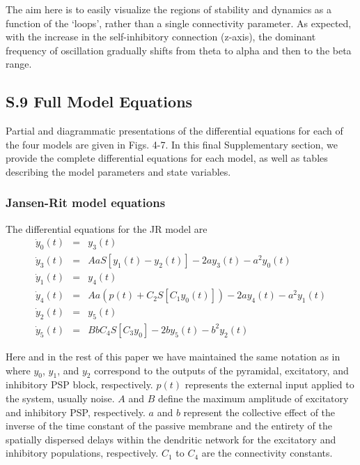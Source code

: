 \documentclass[12pt,twoside]{article}
\begin{document}
The aim here is to easily visualize the regions of stability and dynamics as a function of the `loops', rather than a single connectivity parameter. As expected, with the increase in the self-inhibitory connection (z-axis), the dominant frequency of oscillation gradually shifts from theta to alpha and then to the beta range.




\newpage
\subsection*{S.9 Full Model Equations}

Partial and diagrammatic presentations of the differential equations for each of the four models are given in Figs. 4-7. In this final Supplementary section, we provide the complete differential equations for each model, as well as tables describing the model parameters and state variables. 


\subsubsection*{Jansen-Rit model equations}

The differential equations for the JR model are
\begin{eqnarray}
    \dot{y}_{0}(t) &=& y_{3}(t)\\
    \dot{y}_{3}(t) &=& AaS[y_{1}(t)-y_{2}(t)] - 2ay_{3}(t) - a^{2}y_{0}(t)\\
    \dot{y}_{1}(t) &=& y_{4}(t)\\
    \dot{y}_{4}(t) &=& Aa(p(t) + C_{2}S[C_{1}y_{0}(t)]) - 2ay_{4}(t) - a^{2}y_{1}(t)\\
    \dot{y}_{2}(t) &=& y_{5}(t)\\
    \dot{y}_{5}(t) &=& BbC_{4}S[C_{3}y_{0}] - 2by_{5}(t) - b^{2}y_{2}(t)
\end{eqnarray}


Here and in the rest of this paper we have maintained the same notation as in \citet{jansen1995electroencephalogram} where $y_0$, $y_1$, and $y_2$ correspond to the outputs of the pyramidal, excitatory, and inhibitory PSP block, respectively. $p(t)$ represents the external input applied to the system, usually noise. $A$ and $B$ define the maximum amplitude of excitatory and inhibitory PSP, respectively. $a$ and $b$ represent the collective effect of the inverse of the time constant of the passive membrane and the entirety of the spatially dispersed delays within the dendritic network for the excitatory and inhibitory populations, respectively. $C_1$ to $C_4$ are the connectivity constants.
\end{document}
